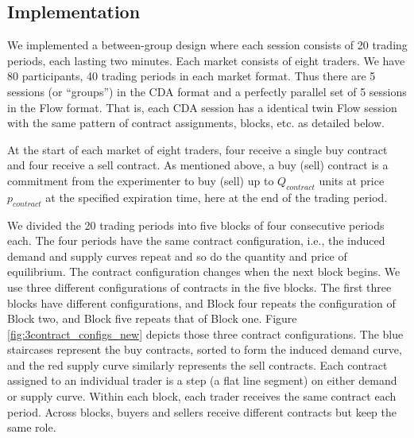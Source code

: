 \subsection{Implementation}\label{sect:design}

We implemented a between-group design where each session consists of 20 trading periods, each lasting two minutes. Each market consists of eight traders.  We have 80 participants, 40 trading periods in each market format. Thus there are 5 sessions (or ``groups'') in the CDA format and a perfectly parallel set of 5 sessions in the Flow format. 
That is, each CDA session has a identical twin Flow session with the same pattern of contract assignments, blocks, etc. as detailed below. 

At the start of each market of eight traders, four receive a single buy contract and four receive a sell contract. %
As mentioned above, %
a buy (sell) contract is a commitment from the experimenter to buy (sell) up to $Q_{\textit{contract}}$ units at price $p_{\textit{contract}}$ at the specified expiration time, here at the end of the trading period. %

We divided the 20 trading periods into five blocks of four consecutive periods each. The four periods have the same contract configuration, i.e., the induced demand and supply curves repeat and so do the quantity and price of equilibrium. The contract configuration changes when the next block begins. We use three different configurations of contracts in the five blocks. The first three blocks have different configurations, and Block four repeats the configuration of Block two, and Block five repeats that of Block one.
Figure \ref{fig:3contract_configs_new} depicts those three contract configurations. %
The blue staircases represent the buy contracts, sorted to form the induced demand curve, and the red supply curve similarly represents the sell contracts. 
Each contract assigned to an individual trader is a step (a flat line segment) on either demand or supply curve. 
Within each block, each trader receives the same contract each period. Across blocks, buyers and sellers receive different contracts but keep the same role. %



